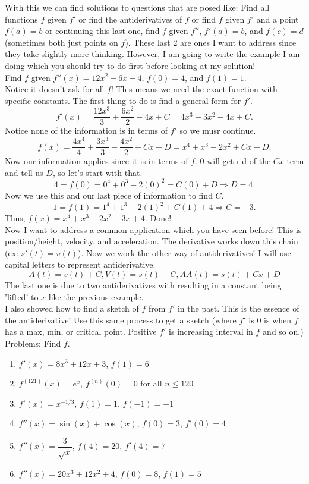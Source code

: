 \documentclass[10pt]{article}
\theoremstyle{Theorem}
\theoremstyle{definition}
\theoremstyle{remark}
\theoremstyle{custom}
\begin{document}
With this we can find solutions to questions that are posed like: Find all functions $f$ given $f'$ or find the antiderivatives of $f$ or find $f$ given $f'$ and a point $f(a)=b$ or continuing this last one, find $f$ given $f''$, $f'(a)=b$, and $f(c)=d$ (sometimes both just points on $f$). These last 2 are ones I want to address since they take slightly more thinking. However, I am going to write the example I am doing which you should try to do first before looking at my solution!\\
Find $f$ given $f''(x)=12x^2+6x-4$, $f(0)=4$, and $f(1)=1$.\\
Notice it doesn't ask for all $f$! This means we need the exact function with specific constants. The first thing to do is find a general form for $f'$. 
\[
f'(x)=\dfrac{12x^3}{3}+\dfrac{6x^2}{2}-4x+C=4x^3+3x^2-4x+C.
\] 
Notice none of the information is in terms of $f'$ so we musr continue.
\[
f(x)=\dfrac{4x^4}{4}+\dfrac{3x^3}{3}-\dfrac{4x^2}{2}+Cx+D=x^4+x^3-2x^2+Cx+D.
\]
Now our information applies since it is in terms of $f$. 0 will get rid of the $Cx$ term and tell us $D$, so let's start with that.
\[
4=f(0)=0^4+0^3-2(0)^2=C(0)+D\Rightarrow D=4.
\]
Now we use this and our last piece of information to find $C$.
\[
1=f(1)=1^4+1^3-2(1)^2+C(1)+4\Rightarrow C=-3.
\]
Thus, $f(x)=x^4+x^3-2x^2-3x+4$. Done!\\
Now I want to address a common application which you have seen before! This is position/height, velocity, and acceleration. The derivative works down this chain (ex: $s'(t)=v(t)$). Now we work the other way of antiderivatives! I will use capital letters to represent antiderivative.
\[
A(t)=v(t)+C, V(t)=s(t)+C, AA(t)=s(t)+Cx+D
\]
The last one is due to two antiderivatives with resulting in a constant being 'lifted' to $x$ like the previous example.\\
I also showed how to find a sketch of $f$ from $f'$ in the past. This is the essence of the antiderivative! Use this same process to get a sketch (where $f'$ is 0 is when $f$ has a max, min, or critical point. Positive $f'$ is increasing interval in $f$ and so on.)
\newpage
\noindent Problems:  Find $f$.
\begin{enumerate}[1.]
\item $f'(x)=8x^3+12x+3$, $f(1)=6$
\item $f^{(121)}(x)=e^x$, $f^{(n)}(0)=0$ for all $n\leq 120$
\item $f'(x)=x^{-1/3}$, $f(1)=1$, $f(-1)=-1$
\item $f''(x)=\sin(x)+\cos(x)$, $f(0)=3$, $f'(0)=4$
\item $f''(x)=\dfrac{3}{\sqrt{x}}$, $f(4)=20$, $f'(4)=7$
\item $f''(x)=20x^3+12x^2+4$, $f(0)=8$, $f(1)=5$


\end{enumerate}
\end{document}
